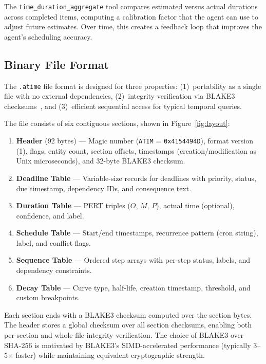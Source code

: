\documentclass[10pt, twocolumn]{article}
\begin{document}
The \texttt{time\_duration\_aggregate} tool compares estimated versus actual durations across completed items, computing a calibration factor that the agent can use to adjust future estimates. Over time, this creates a feedback loop that improves the agent's scheduling accuracy.


\subsection{Binary File Format}
\label{sec:format}

The \texttt{.atime} file format is designed for three properties: (1)~portability as a single file with no external dependencies, (2)~integrity verification via BLAKE3 checksums~\cite{blake3_2020}, and (3)~efficient sequential access for typical temporal queries.

The file consists of six contiguous sections, shown in Figure~\ref{fig:layout}:

\begin{enumerate}[nosep, leftmargin=*]
  \item \textbf{Header} (92 bytes) --- Magic number (\texttt{ATIM} = \texttt{0x4154494D}), format version (1), flags, entity count, section offsets, timestamps (creation/modification as Unix microseconds), and 32-byte BLAKE3 checksum.
  \item \textbf{Deadline Table} --- Variable-size records for deadlines with priority, status, due timestamp, dependency IDs, and consequence text.
  \item \textbf{Duration Table} --- PERT triples ($O$, $M$, $P$), actual time (optional), confidence, and label.
  \item \textbf{Schedule Table} --- Start/end timestamps, recurrence pattern (cron string), label, and conflict flags.
  \item \textbf{Sequence Table} --- Ordered step arrays with per-step status, labels, and dependency constraints.
  \item \textbf{Decay Table} --- Curve type, half-life, creation timestamp, threshold, and custom breakpoints.
\end{enumerate}

Each section ends with a BLAKE3 checksum computed over the section bytes. The header stores a global checksum over all section checksums, enabling both per-section and whole-file integrity verification. The choice of BLAKE3 over SHA-256 is motivated by BLAKE3's SIMD-accelerated performance (typically 3--5$\times$ faster) while maintaining equivalent cryptographic strength.
\end{document}
